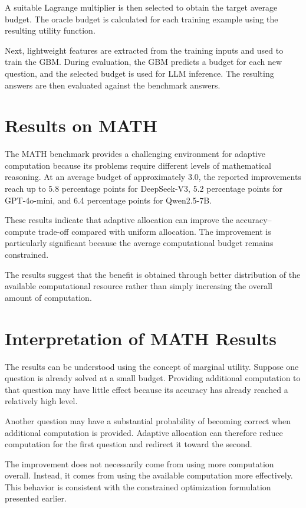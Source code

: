 \documentclass[12pt,a4paper,titlepage]{report}
\begin{document}
A suitable Lagrange multiplier is then selected to obtain the target average budget. The oracle budget is calculated for each training example using the resulting utility function.

Next, lightweight features are extracted from the training inputs and used to train the GBM. During evaluation, the GBM predicts a budget for each new question, and the selected budget is used for LLM inference. The resulting answers are then evaluated against the benchmark answers.

\section{Results on MATH}

The MATH benchmark provides a challenging environment for adaptive computation because its problems require different levels of mathematical reasoning. At an average budget of approximately $3.0$, the reported improvements reach up to 5.8 percentage points for DeepSeek-V3, 5.2 percentage points for GPT-4o-mini, and 6.4 percentage points for Qwen2.5-7B.

These results indicate that adaptive allocation can improve the accuracy--compute trade-off compared with uniform allocation. The improvement is particularly significant because the average computational budget remains constrained.

The results suggest that the benefit is obtained through better distribution of the available computational resource rather than simply increasing the overall amount of computation.

\section{Interpretation of MATH Results}

The results can be understood using the concept of marginal utility. Suppose one question is already solved at a small budget. Providing additional computation to that question may have little effect because its accuracy has already reached a relatively high level.

Another question may have a substantial probability of becoming correct when additional computation is provided. Adaptive allocation can therefore reduce computation for the first question and redirect it toward the second.

The improvement does not necessarily come from using more computation overall. Instead, it comes from using the available computation more effectively. This behavior is consistent with the constrained optimization formulation presented earlier.
\end{document}
